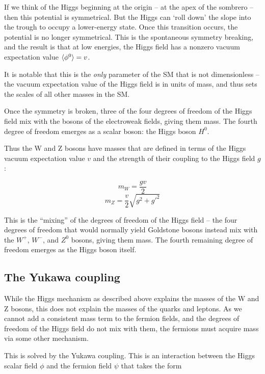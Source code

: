 If we think of the Higgs beginning at the origin -- at the apex of the sombrero -- then this potential is symmetrical. But the Higgs can `roll down' the slope into the trough to occupy a lower-energy state. Once this transition occurs, the potential is no longer symmetrical. This is the spontaneous symmetry breaking, and the result is that at low energies, the Higgs field has a nonzero vacuum expectation value $\braket{\phi^0} = v$.

It is notable that this is the \textit{only} parameter of the \acrlong{SM} that is not dimensionless -- the vacuum expectation value of the Higgs field is in units of mass, and thus sets the scales of all other masses in the \acrshort{SM}. 

Once the symmetry is broken, three of the four degrees of freedom of the Higgs field mix with the bosons of the electroweak fields, giving them mass. The fourth degree of freedom emerges as a scalar boson: the Higgs boson $H^0$.

Thus the W and Z bosons have masses that are defined in terms of the Higgs vacuum expectation value $v$ and the strength of their coupling to the Higgs field $g$:

\begin{equation}
	m_W = \frac{gv}{2}
\label{eq:w-mass}
\end{equation}
\begin{equation}
	m_Z = \frac{v}{2}\sqrt{g^2 + g'^2}
\label{eq:z-mass}
\end{equation}

This is the ``mixing'' of the degrees of freedom of the Higgs field -- the four degrees of freedom that would normally yield Goldstone bosons instead mix with the $W^+$, $W^-$, and $Z^0$ bosons, giving them mass. The fourth remaining degree of freedom emerges as the Higgs boson itself.

\subsection{The Yukawa coupling}
While the Higgs mechanism as described above explains the masses of the W and Z bosons, this does not explain the masses of the quarks and leptons. As we cannot add a consistent mass term to the fermion fields, and the degrees of freedom of the Higgs field do not mix with them, the fermions must acquire mass via some other mechanism.

This is solved by the Yukawa coupling. This is an interaction between the Higgs scalar field $\phi$ and the fermion field $\psi$ that takes the form

